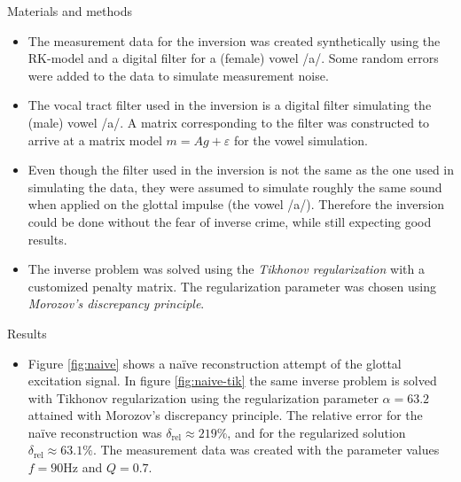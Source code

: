 \documentclass[final]{beamer}
\newcommand{\eps}{\ensuremath{\varepsilon}}
\begin{document}
\begin{frame}[t]
\begin{columns}[t]
\begin{column}{.465\textwidth}
\begin{block}{Materials and methods}
\begin{itemize}
\item The measurement data for the inversion was created synthetically using the RK-model and a digital filter for a (female) vowel /a/. Some random errors were added to the data to simulate measurement noise.

\item The vocal tract filter used in the inversion is a digital filter simulating the (male) vowel /a/. A matrix corresponding to the filter was constructed to arrive at a matrix model $m = A g + \eps$ for the vowel simulation.

\item Even though the filter used in the inversion is not the same as the one used in simulating the data, they were assumed to simulate roughly the same sound when applied on the glottal impulse (the vowel /a/). Therefore the inversion could be done without the fear of inverse crime, while still expecting good results.

\item The inverse problem was solved using the \emph{Tikhonov regularization} with a customized penalty matrix. The regularization parameter was chosen using \emph{Morozov's discrepancy principle}.

\end{itemize}

\end{block}




\begin{block}{Results}

\begin{itemize}

\item Figure \ref{fig:naive} shows a naïve reconstruction attempt of the glottal excitation signal. In figure \ref{fig:naive-tik} the same inverse problem is solved with Tikhonov regularization using the regularization parameter $\alpha = 63.2$ attained with Morozov's discrepancy principle. The relative error for the naïve reconstruction was $\delta_{\text{rel}} \approx 219 \%$, and for the regularized solution $\delta_{\text{rel}} \approx 63.1 \%$. The measurement data was created with the parameter values $f = 90 \text{Hz}$ and $Q = 0.7$.


\end{itemize}
\end{block}
\end{column}
\end{columns}
\end{frame}
\end{document}

